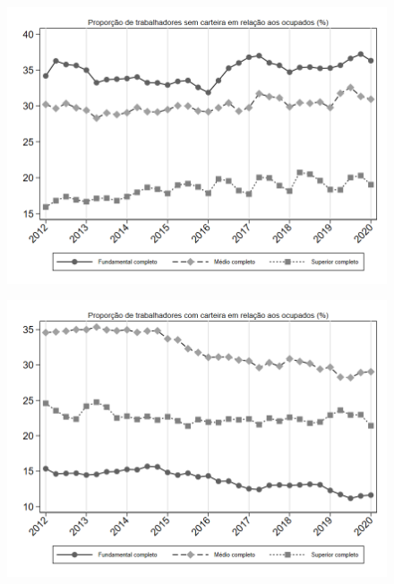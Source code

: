 \begin{frame}[label=_composicao_demografica_educacao_prop_empregadoSC]{}
\textit{\hyperlink{_composicao_demografica_educacao}{}}
\begin{figure}
  \centering
  \includegraphics[width=1.0\linewidth]{../../analysis/output/composicao_demografica/educacao/_composicao_demografica_educacao_prop_empregadoSC.png}
  \caption{}
  \label{fig:_composicao_demografica_educacao_prop_empregadoSC}
\end{figure}
\end{frame}

\begin{frame}[label=_composicao_demografica_educacao_prop_empregadoCC]{}
\textit{\hyperlink{_composicao_demografica_educacao}{}}
\begin{figure}
  \centering
  \includegraphics[width=1.0\linewidth]{../../analysis/output/composicao_demografica/educacao/_composicao_demografica_educacao_prop_empregadoCC.png}
  \caption{}
  \label{fig:_composicao_demografica_educacao_prop_empregadoCC}
\end{figure}
\end{frame}

